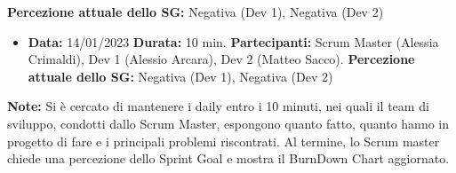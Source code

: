 \documentclass[a4paper, oneside]{article}
\newcommand\uno{Scrum Master (Alessia Crimaldi), Dev 1 (Alessio Arcara), Dev 2 (Matteo Sacco).}
\begin{document}
\begin{landscape}
\begin{itemize}
            \newline \textbf{Percezione attuale dello SG:} Negativa (Dev 1), Negativa (Dev 2)
        \end{itemize}
        \begin{itemize}
            \item \textbf{Data:} 14/01/2023
            \newline \textbf{Durata:} 10 min.
            \newline \textbf{Partecipanti:} \uno
            \newline \textbf{Percezione attuale dello SG:} Negativa (Dev 1), Negativa (Dev 2)
        \end{itemize}
        \vspace{2mm} %
        \textbf{Note:} Si è cercato di mantenere i daily entro i 10 minuti, nei quali il team di sviluppo, condotti dallo Scrum Master, espongono quanto fatto, quanto hanno in progetto di fare e i principali problemi riscontrati. Al termine, lo Scrum master chiede una percezione dello Sprint Goal e mostra il BurnDown Chart aggiornato.

        \newpage

\end{landscape}
\end{document}
